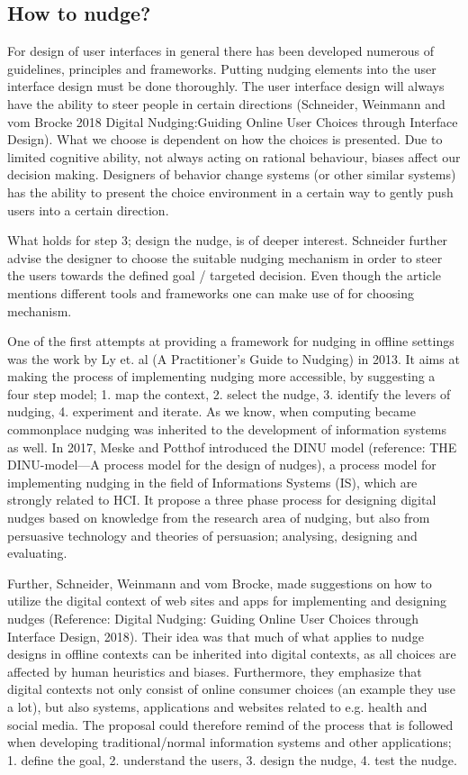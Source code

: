 \subsection{How to nudge?}
For design of user interfaces in general there has been developed numerous of guidelines, principles and frameworks. Putting nudging elements into the user interface design must be done thoroughly. The user interface design will always have the ability to steer people in certain directions (Schneider, Weinmann and vom Brocke 2018 Digital Nudging:Guiding Online User Choices through Interface Design). What we choose is dependent on how the choices is presented. Due to limited cognitive ability, not always acting on rational behaviour, biases affect our decision making. Designers of behavior change systems (or other similar systems) has the ability to present the choice environment in a certain way to gently push users into a certain direction. 

What holds for step 3; design the nudge, is of deeper interest. Schneider further advise the designer to choose the suitable nudging mechanism in order to steer the users towards the defined goal / targeted decision. Even though the article mentions different tools and frameworks one can make use of for choosing mechanism. 

One of the first attempts at providing a framework for nudging in offline settings was the work by Ly et. al (A Practitioner’s Guide to Nudging) in 2013. It aims at making the process of implementing nudging more accessible, by suggesting a four step model; 1. map the context, 2. select the nudge, 3. identify the levers of nudging, 4. experiment and iterate. As we know, when computing became commonplace nudging was inherited to the development of information systems as well. In 2017, Meske and Potthof introduced the DINU model (reference: THE DINU-model—A process model for the design of nudges), a process model for implementing nudging in the field of Informations Systems (IS), which are strongly related to HCI. It propose a three phase process for designing digital nudges based on knowledge from the research area of nudging, but also from persuasive technology and theories of persuasion; analysing, designing and evaluating. 

Further, Schneider, Weinmann and vom Brocke, made suggestions on how to utilize the digital context of web sites and apps for implementing and designing nudges (Reference: Digital Nudging: Guiding Online User Choices through Interface Design, 2018). Their idea was that much of what applies to nudge designs in offline contexts can be inherited into digital contexts, as all choices are affected by human heuristics and biases. Furthermore, they emphasize that digital contexts not only consist of online consumer choices (an example they use a lot), but also systems, applications and websites related to e.g. health and social media. The proposal could therefore remind of the process that is followed when developing traditional/normal information systems and other applications; 1. define  the  goal, 2. understand  the  users, 3. design  the  nudge,  4. test  the  nudge. 

